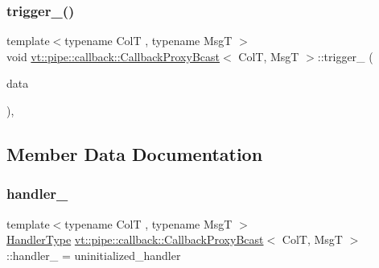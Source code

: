 \mbox{\label{structvt_1_1pipe_1_1callback_1_1_callback_proxy_bcast_a6ec265f95247ccdb1e2dcca909823ae8}} 
\subsubsection{\texorpdfstring{trigger\+\_\+()}{trigger\_()}}
{\footnotesize\ttfamily template$<$typename ColT , typename MsgT $>$ \\
void \hyperlink{structvt_1_1pipe_1_1callback_1_1_callback_proxy_bcast}{vt\+::pipe\+::callback\+::\+Callback\+Proxy\+Bcast}$<$ ColT, MsgT $>$\+::trigger\+\_\+ (\begin{DoxyParamCaption}\item[{\hyperlink{structvt_1_1pipe_1_1callback_1_1_callback_proxy_bcast_ae26574a2b9198a4b4e427bbaab76de53}{Signal\+Data\+Type} $\ast$}]{data }\end{DoxyParamCaption})\hspace{0.3cm}{\ttfamily [override]}, {\ttfamily [private]}}



\subsection{Member Data Documentation}
\mbox{\label{structvt_1_1pipe_1_1callback_1_1_callback_proxy_bcast_a586222031b5cc4c5e3bd77655331c527}} 
\subsubsection{\texorpdfstring{handler\+\_\+}{handler\_}}
{\footnotesize\ttfamily template$<$typename ColT , typename MsgT $>$ \\
\hyperlink{namespacevt_af64846b57dfcaf104da3ef6967917573}{Handler\+Type} \hyperlink{structvt_1_1pipe_1_1callback_1_1_callback_proxy_bcast}{vt\+::pipe\+::callback\+::\+Callback\+Proxy\+Bcast}$<$ ColT, MsgT $>$\+::handler\+\_\+ = uninitialized\+\_\+handler\hspace{0.3cm}{\ttfamily [private]}}

